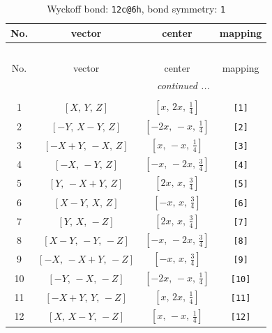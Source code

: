 \documentclass[fleqn,8pt]{jsarticle}
\begin{document}
\begin{longtable}{cccc}
\caption{Wyckoff bond: {\tt 12c@6h}, bond symmetry: {\tt 1}}
 \\
 \hline \hline
No. & vector & center & mapping \\ \hline \endfirsthead

\multicolumn{3}{l}{\tablename\ \thetable{}} \\
 \hline \hline
No. & vector & center & mapping \\ \hline \endhead

 \hline \hline
\multicolumn{3}{r}{\footnotesize\it continued ...} \\ \endfoot

 \hline \hline
\multicolumn{3}{r}{} \\ \endlastfoot

1 & $\left[ X,\, Y,\, Z \right]$ & $\left[ x,\, 2 x,\, \frac{1}{4} \right]$ & {\tt [1]} \\ \hline
2 & $\left[ - Y,\, X - Y,\, Z \right]$ & $\left[ - 2 x,\, - x,\, \frac{1}{4} \right]$ & {\tt [2]} \\ \hline
3 & $\left[ - X + Y,\, - X,\, Z \right]$ & $\left[ x,\, - x,\, \frac{1}{4} \right]$ & {\tt [3]} \\ \hline
4 & $\left[ - X,\, - Y,\, Z \right]$ & $\left[ - x,\, - 2 x,\, \frac{3}{4} \right]$ & {\tt [4]} \\ \hline
5 & $\left[ Y,\, - X + Y,\, Z \right]$ & $\left[ 2 x,\, x,\, \frac{3}{4} \right]$ & {\tt [5]} \\ \hline
6 & $\left[ X - Y,\, X,\, Z \right]$ & $\left[ - x,\, x,\, \frac{3}{4} \right]$ & {\tt [6]} \\ \hline
7 & $\left[ Y,\, X,\, - Z \right]$ & $\left[ 2 x,\, x,\, \frac{3}{4} \right]$ & {\tt [7]} \\ \hline
8 & $\left[ X - Y,\, - Y,\, - Z \right]$ & $\left[ - x,\, - 2 x,\, \frac{3}{4} \right]$ & {\tt [8]} \\ \hline
9 & $\left[ - X,\, - X + Y,\, - Z \right]$ & $\left[ - x,\, x,\, \frac{3}{4} \right]$ & {\tt [9]} \\ \hline
10 & $\left[ - Y,\, - X,\, - Z \right]$ & $\left[ - 2 x,\, - x,\, \frac{1}{4} \right]$ & {\tt [10]} \\ \hline
11 & $\left[ - X + Y,\, Y,\, - Z \right]$ & $\left[ x,\, 2 x,\, \frac{1}{4} \right]$ & {\tt [11]} \\ \hline
12 & $\left[ X,\, X - Y,\, - Z \right]$ & $\left[ x,\, - x,\, \frac{1}{4} \right]$ & {\tt [12]} \\
\end{longtable}
\end{document}
